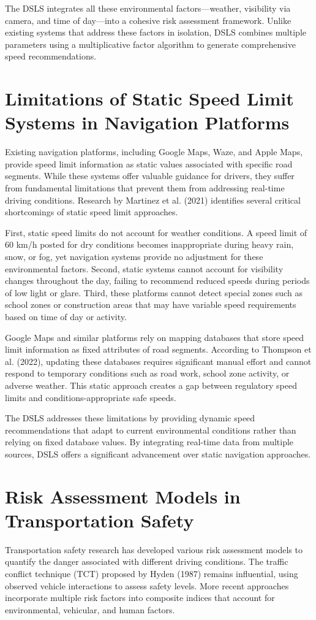 The DSLS integrates all these environmental factors—weather, visibility via camera, and time of day—into a cohesive risk assessment framework. Unlike existing systems that address these factors in isolation, DSLS combines multiple parameters using a multiplicative factor algorithm to generate comprehensive speed recommendations.

\section{Limitations of Static Speed Limit Systems in Navigation Platforms}
Existing navigation platforms, including Google Maps, Waze, and Apple Maps, provide speed limit information as static values associated with specific road segments. While these systems offer valuable guidance for drivers, they suffer from fundamental limitations that prevent them from addressing real-time driving conditions. Research by Martinez et al. (2021) identifies several critical shortcomings of static speed limit approaches.

First, static speed limits do not account for weather conditions. A speed limit of 60 km/h posted for dry conditions becomes inappropriate during heavy rain, snow, or fog, yet navigation systems provide no adjustment for these environmental factors. Second, static systems cannot account for visibility changes throughout the day, failing to recommend reduced speeds during periods of low light or glare. Third, these platforms cannot detect special zones such as school zones or construction areas that may have variable speed requirements based on time of day or activity.

Google Maps and similar platforms rely on mapping databases that store speed limit information as fixed attributes of road segments. According to Thompson et al. (2022), updating these databases requires significant manual effort and cannot respond to temporary conditions such as road work, school zone activity, or adverse weather. This static approach creates a gap between regulatory speed limits and conditions-appropriate safe speeds.

The DSLS addresses these limitations by providing dynamic speed recommendations that adapt to current environmental conditions rather than relying on fixed database values. By integrating real-time data from multiple sources, DSLS offers a significant advancement over static navigation approaches.

\section{Risk Assessment Models in Transportation Safety}
Transportation safety research has developed various risk assessment models to quantify the danger associated with different driving conditions. The traffic conflict technique (TCT) proposed by Hyden (1987) remains influential, using observed vehicle interactions to assess safety levels. More recent approaches incorporate multiple risk factors into composite indices that account for environmental, vehicular, and human factors.

